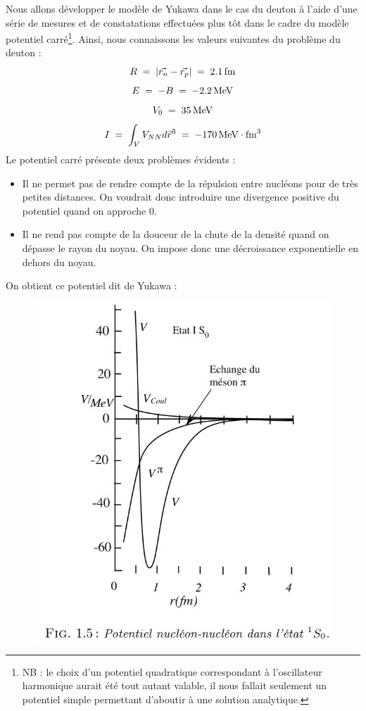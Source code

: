Nous allons développer le modèle de Yukawa dans le cas du deuton à l'aide d'une série de mesures et de constatations effectuées plus tôt dans le cadre du modèle potentiel carré\footnote{NB : le choix d'un potentiel quadratique correspondant à l'oscillateur harmonique aurait été tout autant valable, il nous fallait seulement un potentiel simple permettant d'aboutir à une solution analytique.}. Ainsi, nous connaissons les valeurs suivantes du problème du deuton :
\[
    R \; = \; |\Vec{r_n} - \Vec{r_p}| \; = \; \SI{2.1}{fm}
\]
\[
    E \; = \; -B \; = \; \SI{-2.2}{MeV}
\]
\[
    V_0 \; = \; \SI{35}{MeV}
\]
\[
    I \; = \; \int_V V_{NN}d\vec{r}^3 \; = \; \SI{-170}{MeV \cdot fm^3}
\]
Le potentiel carré présente deux problèmes évidents :
\begin{itemize}[label = $\bullet$]
    \item Il ne permet pas de rendre compte de la répulsion entre nucléons pour de très petites distances. On voudrait donc introduire une divergence positive du potentiel quand on approche 0.
    \item Il ne rend pas compte de la douceur de la chute de la densité quand on dépasse le rayon du noyau. On impose donc une décroissance exponentielle en dehors du noyau.
\end{itemize}
On obtient ce potentiel dit de Yukawa :
\begin{figure}[H]
    \centering
    \includegraphics[scale =0.42] {Images4/Potentiel_Yukawa.jpg}
\end{figure}
